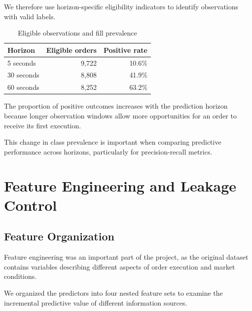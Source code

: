 \documentclass[11pt,a4paper]{article}
\begin{document}
We therefore use horizon-specific eligibility indicators
to identify observations with valid labels.

\begin{table}[htbp]
	\centering
	\caption{Eligible observations and fill prevalence}
	\label{tab:eligible_orders}
	\begin{tabular}{lrr}
		\toprule
		Horizon & Eligible orders & Positive rate \\
		\midrule
		5 seconds  & 9,722 & 10.6\% \\
		30 seconds & 8,808 & 41.9\% \\
		60 seconds & 8,252 & 63.2\% \\
		\bottomrule
	\end{tabular}
\end{table}

The proportion of positive outcomes increases with
the prediction horizon because longer observation
windows allow more opportunities for an order to
receive its first execution.

This change in class prevalence is important when
comparing predictive performance across horizons,
particularly for precision-recall metrics.


\section{Feature Engineering and Leakage Control}

\subsection{Feature Organization}

Feature engineering was an important part of the project,
as the original dataset contains variables describing
different aspects of order execution and market conditions.

We organized the predictors into four nested feature sets
to examine the incremental predictive value of different
information sources.
\end{document}
